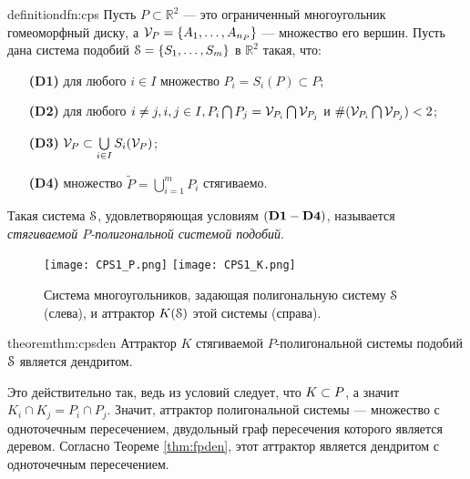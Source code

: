 
\begin{restatethis}{definition}{dfn:cps} \label{dfn:cps}
Пусть $P\subset\mathbb{R}^2$ --- это ограниченный многоугольник гомеоморфный диску, а $ {\mathcal V}_P= \{A_1, \ldots, A_{n_P}\}$ --- множество его вершин.
Пусть дана система подобий ${\EuScript S} = \{S_1, \ldots, S_m\}$ в ${\mathbb{R}}^2$ такая, что:
\begin{itemize}[nolistsep]
\item[{\bf (D1)}] для любого $i \in I$ множество $P_i = S_i (P) \subset P$; 
\item[{\bf (D2)}] для любого $i \ne j, i, j \in I, P_i \bigcap P_j =  {\mathcal V}_{P_i} \bigcap  {\mathcal V}_{P_j}$ и $\#({\mathcal V}_{P_i} \bigcap  {\mathcal V}_{P_j})<2$;  
\item[{\bf (D3)}] ${\mathcal V}_P \subset \bigcup \limits_{i \in I} S_i ({\mathcal V}_P)$;
\item[{\bf (D4)}] множество $\widetilde P = \bigcup \limits_{i = 1} ^m P_i$ стягиваемо.
\end{itemize} 
Такая система  ${\EuScript S}$, удовлетворяющая условиям $\bf (D1 - D4)$, называется  {\em стягиваемой $P$-полигональной системой подобий}.
\end{restatethis}

\begin{figure}[H]
\texttt{[image: CPS1\_P.png]}
\hfill
\texttt{[image: CPS1\_K.png]}
\caption{Система многоугольников, задающая полигональную систему ${\EuScript S}$ (слева), и аттрактор $K({\EuScript S})$ этой системы (справа).}
\end{figure}

\begin{restatethis}{theorem}{thm:cpsden} %
Аттрактор $K$  стягиваемой  $P$-полигональной системы подобий ${\EuScript S}$ является дендритом.
\end{restatethis}

Это действительно так, ведь из условий следует, что $K\subset P$, а значит $K_i\cap K_j=P_i\cap P_j$.
Значит, аттрактор полигональной системы --- множество с одноточечным пересечением, двудольный граф пересечения которого является деревом.
Согласно Теореме \ref{thm:fpden}, этот аттрактор является дендритом с одноточечным пересечением.\\


